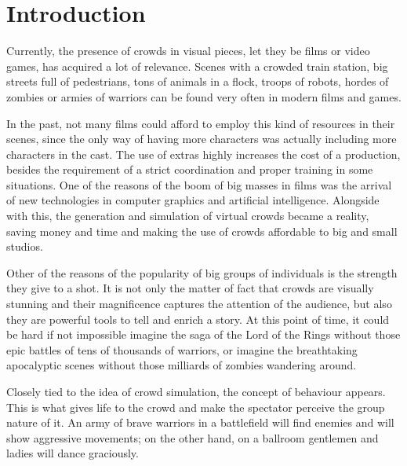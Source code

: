 
\ifx\isEmbedded\undefined

\graphicspath{{../img/}}

\fi

\chapter{Introduction}
\label{chap:intro}

Currently, the presence of crowds in visual pieces, let they be films or video games, has acquired a lot of relevance. Scenes with a crowded train station, big streets full of pedestrians, tons of animals in a flock, troops of robots, hordes of zombies or armies of warriors can be found very often in modern films and games.

In the past, not many films could afford to employ this kind of resources in their scenes, since the only way of having more characters was actually including more characters in the cast. The use of extras highly increases the cost of a production, besides the requirement of a strict coordination and proper training in some situations. One of the reasons of the boom of big masses in films was the arrival of new technologies in computer graphics and artificial intelligence. Alongside with this, the generation and simulation of virtual crowds became a reality, saving money and time and making the use of crowds affordable to big and small studios.

Other of the reasons of the popularity of big groups of individuals is the strength they give to a shot. It is not only the matter of fact that crowds are visually stunning and their magnificence captures the attention of the audience, but also they are powerful tools to tell and enrich a story. At this point of time, it could be hard if not impossible imagine the saga of the Lord of the Rings without those epic battles of tens of thousands of warriors, or imagine the breathtaking apocalyptic scenes without those milliards of zombies wandering around.

Closely tied to the idea of crowd simulation, the concept of behaviour appears. This is what gives life to the crowd and make the spectator perceive the group nature of it. An army of brave warriors in a battlefield will find enemies and will show aggressive movements; on the other hand, on a ballroom gentlemen and ladies will dance graciously.

